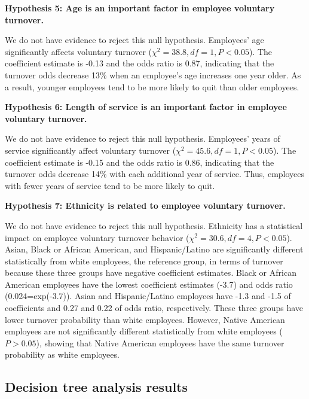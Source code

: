 \textbf{Hypothesis 5: Age is an important factor in employee voluntary turnover.}

We do not have evidence to reject this null hypothesis. Employees' age significantly affects voluntary turnover ($\chi^2=38.8, df=1, P<0.05$). The coefficient estimate is -0.13 and the odds ratio is 0.87, indicating that the turnover odds decrease 13\% when an employee's age increases one year older. As a result, younger employees tend to be more likely to quit than older employees.    

\textbf{Hypothesis 6: Length of service is an important factor in employee voluntary turnover.}

We do not have evidence to reject this null hypothesis. Employees' years of service significantly affect voluntary turnover ($\chi^2=45.6, df=1, P<0.05$). The coefficient estimate is -0.15 and the odds ratio is 0.86, indicating that the turnover odds decrease 14\% with each additional year of service. Thus, employees with fewer years of service tend to be more likely to quit.        

\textbf{Hypothesis 7: Ethnicity is related to employee voluntary turnover.}

We do not have evidence to reject this null hypothesis. Ethnicity has a statistical impact on employee voluntary turnover behavior ($\chi^2=30.6, df=4, P<0.05$). Asian, Black or African American, and Hispanic/Latino are significantly different statistically from white employees, the reference group, in terms of turnover because these three groups have negative coefficient estimates. Black or African American employees have the lowest coefficient estimates (-3.7) and odds ratio (0.024=exp(-3.7)). Asian and Hispanic/Latino employees have -1.3 and -1.5 of coefficients and 0.27 and 0.22 of odds ratio, respectively. These three groups have lower turnover probability than white employees. However, Native American employees are not significantly different statistically from white employees ($P > 0.05$), showing that Native American employees have the same turnover probability as white employees. 
\subsection{Decision tree analysis results}

